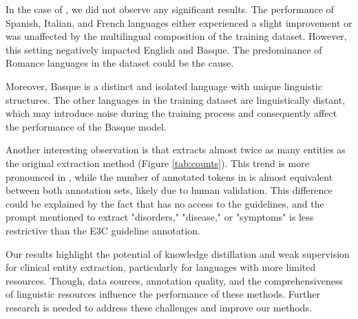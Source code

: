 In the case of \SettingE, we did not observe any significant results. The performance of Spanish, Italian, and French languages either experienced a slight improvement or was unaffected by the multilingual composition of the training dataset. However, this setting negatively impacted English and Basque. The predominance of Romance languages in the dataset could be the cause.

Moreover, Basque is a distinct and isolated language with unique linguistic structures. The other languages in the training dataset are linguistically distant, which may introduce noise during the training process and consequently affect the performance of the Basque model.

Another interesting observation is that \instruct extracts almost twice as many entities as the original extraction method (Figure \ref{tab:counts}). This trend is more pronounced in \layerTwo, while the number of annotated tokens in \layerValidate is almost equivalent between both annotation sets, likely due to human validation. This difference could be explained by the fact that \instruct has no access to the guidelines, and the prompt mentioned to extract "disorders," "disease," or "symptoms" is less restrictive than the E3C guideline annotation.

Our results highlight the potential of knowledge distillation and weak supervision for clinical entity extraction, particularly for languages with more limited resources. Though, data sources, annotation quality, and the comprehensiveness of linguistic resources influence the performance of these methods. 
Further research is needed to address these challenges and improve our methods.
